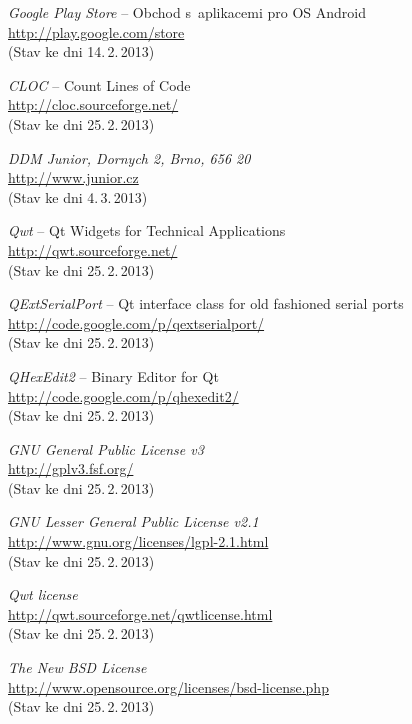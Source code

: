\documentclass[12pt, a4paper, oneside]{article}
\newcommand{\It}{\textit}  %
\begin{document}
\begin{thebibliography}{99}
     \It{Google Play Store} -- Obchod s~aplikacemi pro OS Android\\
    \url{http://play.google.com/store}\\
    (Stav ke dni 14.\,2.\,2013)

     \It{CLOC} -- Count Lines of Code \\
    \url{http://cloc.sourceforge.net/}\\
    (Stav ke dni 25.\,2.\,2013)

     \It{DDM Junior, Dornych 2, Brno, 656 20}\\
    \url{http://www.junior.cz}\\
    (Stav ke dni 4.\,3.\,2013)

     \It{Qwt} -- Qt Widgets for Technical Applications \\
    \url{http://qwt.sourceforge.net/}\\
    (Stav ke dni 25.\,2.\,2013)

     \It{QExtSerialPort} -- Qt interface class for old fashioned serial ports \\
    \url{http://code.google.com/p/qextserialport/}\\
    (Stav ke dni 25.\,2.\,2013)

     \It{QHexEdit2} -- Binary Editor for Qt \\
    \url{http://code.google.com/p/qhexedit2/}\\
    (Stav ke dni 25.\,2.\,2013)

     \It{GNU General Public License v3} \\
    \url{http://gplv3.fsf.org/}\\
    (Stav ke dni 25.\,2.\,2013)

     \It{GNU Lesser General Public License v2.1} \\
    \url{http://www.gnu.org/licenses/lgpl-2.1.html}\\
    (Stav ke dni 25.\,2.\,2013)

     \It{Qwt license} \\
    \url{http://qwt.sourceforge.net/qwtlicense.html}\\
    (Stav ke dni 25.\,2.\,2013)

     \It{The New BSD License} \\
    \url{http://www.opensource.org/licenses/bsd-license.php}\\
    (Stav ke dni 25.\,2.\,2013)


\end{thebibliography}
\end{document}
